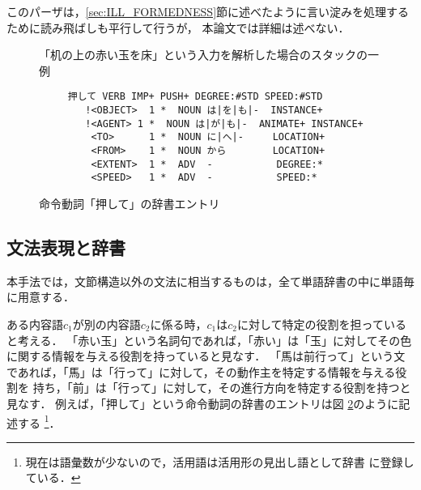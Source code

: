 このパーザは，\ref{sec:ILL_FORMEDNESS}節に述べたように言い淀みを処理するために読み飛ばしも平行して行うが，
本論文では詳細は述べない．

\begin{figure}
\begin{center}
\caption{「机の上の赤い玉を床」という入力を解析した場合のスタックの一例}
\label{fig:STACK}
\end{center}
\end{figure}


\begin{figure}
\begin{center}
\begin{minipage}{.65\linewidth}
\footnotesize
\begin{verbatim}
     押して VERB IMP+ PUSH+ DEGREE:#STD SPEED:#STD
        !<OBJECT>  1 *  NOUN は|を|も|-  INSTANCE+
        !<AGENT> 1 *  NOUN は|が|も|-  ANIMATE+ INSTANCE+
         <TO>      1 *  NOUN に|へ|-     LOCATION+
         <FROM>    1 *  NOUN から        LOCATION+
         <EXTENT>  1 *  ADV  -           DEGREE:*
         <SPEED>   1 *  ADV  -           SPEED:*
\end{verbatim}
\end{minipage}
\end{center}
\caption{命令動詞「押して」の辞書エントリ}
\label{fig:DIC_ENTRY}
\end{figure}

\subsection{文法表現と辞書}
本手法では，文節構造以外の文法に相当するものは，全て単語辞書の中に単語毎に用意する．

ある内容語$c_1$が別の内容語$c_2$に係る時，$c_1$は$c_2$に対して特定の役割を担っていると考える．
「赤い玉」という名詞句であれば，「赤い」は「玉」に対してその色に関する情報を与える役割を持っていると見なす．
「馬は前行って」という文であれば，「馬」は「行って」に対して，その動作主を特定する情報を与える役割を
持ち，「前」は「行って」に対して，その進行方向を特定する役割を持つと見なす．
例えば，「押して」という命令動詞の辞書のエントリは図
\ref{fig:DIC_ENTRY}のように記述する
\footnote{現在は語彙数が少ないので，活用語は活用形の見出し語として辞書
に登録している．}．

